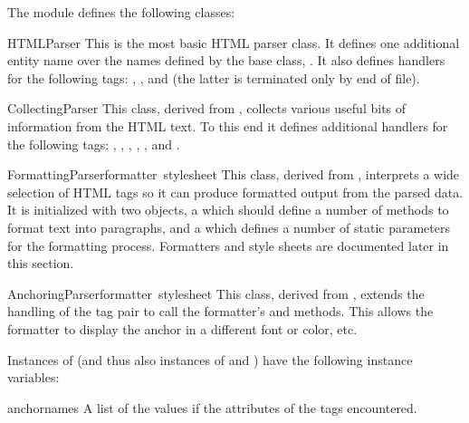 The module defines the following classes:

\begin{funcdesc}{HTMLParser}{}
This is the most basic HTML parser class.  It defines one additional
entity name over the names defined by the  base
class, .  It also defines handlers for the following
tags: , , and
 (the latter is terminated only by end of file).
\end{funcdesc}

\begin{funcdesc}{CollectingParser}{}
This class, derived from , collects various useful
bits of information from the HTML text.  To this end it defines
additional handlers for the following tags: ,
, ,
, , and .
\end{funcdesc}

\begin{funcdesc}{FormattingParser}{formatter\, stylesheet}
This class, derived from , interprets a wide
selection of HTML tags so it can produce formatted output from the
parsed data.  It is initialized with two objects, a 
which should define a number of methods to format text into
paragraphs, and a  which defines a number of static
parameters for the formatting process.  Formatters and style sheets
are documented later in this section.
\end{funcdesc}

\begin{funcdesc}{AnchoringParser}{formatter\, stylesheet}
This class, derived from , extends the handling
of the  tag pair to call the formatter's
 and  methods.  This allows the
formatter to display the anchor in a different font or color, etc.
\end{funcdesc}

Instances of  (and thus also instances of
 and ) have the following
instance variables:

\begin{datadesc}{anchornames}
A list of the values if the  attributes of the 
tags encountered.
\end{datadesc}

